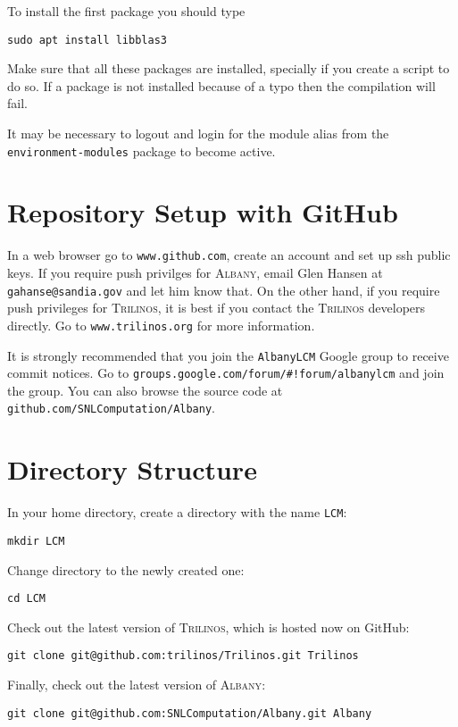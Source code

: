 \documentclass{article}
\newcommand{\trilinos}{\textsc{Trilinos}}
\newcommand{\albany}{\textsc{Albany}}
\begin{document}
To install the
first package you should type
\begin{verbatim}
sudo apt install libblas3
\end{verbatim}

Make sure that all these packages are installed, specially if you
create a script to do so. If a package is not installed because of a
typo then the compilation will fail.

It may be necessary to logout and login for the module alias from the
\verb+environment-modules+ package to become active.

\section{Repository Setup with GitHub}
\label{sec:repo}

In a web browser go to \verb+www.github.com+, create an account and
set up ssh public keys. If you require push privilges for \albany{},
email Glen Hansen at \verb+gahanse@sandia.gov+ and let him know
that. On the other hand, if you require push privileges for \trilinos{},
it is best if you contact the \trilinos{} developers directly. Go to
\verb+www.trilinos.org+ for more information.

It is strongly recommended that you join the \verb+AlbanyLCM+ Google
group to receive commit notices. Go to
\verb+groups.google.com/forum/#!forum/albanylcm+ and join the
group. You can also browse the source code at
\verb+github.com/SNLComputation/Albany+.

\section{Directory Structure}
In your home directory, create a directory with the name \verb+LCM+:
\begin{verbatim}
mkdir LCM
\end{verbatim}

Change directory to the newly created one:
\begin{verbatim}
cd LCM
\end{verbatim}

Check out the latest version of \trilinos{}, which is hosted now on
GitHub:
\begin{verbatim}
git clone git@github.com:trilinos/Trilinos.git Trilinos
\end{verbatim}

Finally, check out the latest version of \albany{}:
\begin{verbatim}
git clone git@github.com:SNLComputation/Albany.git Albany
\end{verbatim}
\end{document}
